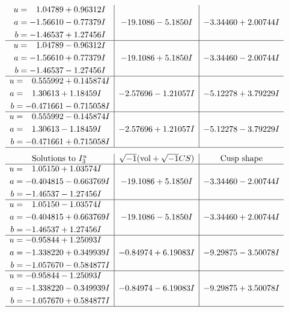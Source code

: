 \documentclass[1p]{elsarticle_modified}
\theoremstyle{definition}
\newcommand{\I}{\sqrt{-1}}
\begin{document}
$$\begin{array}{c|c|c}
\begin{aligned}
u &= \phantom{-}1.04789 + 0.96312 I \\
a &= -1.56610 - 0.77379 I \\
b &= -1.46537 + 1.27456 I\end{aligned}
 & -19.1086 - 5.1850 I & -3.34460 + 2.00744 I \\ \hline\begin{aligned}
u &= \phantom{-}1.04789 - 0.96312 I \\
a &= -1.56610 + 0.77379 I \\
b &= -1.46537 - 1.27456 I\end{aligned}
 & -19.1086 + 5.1850 I & -3.34460 - 2.00744 I \\ \hline\begin{aligned}
u &= \phantom{-}0.555992 + 0.145874 I \\
a &= \phantom{-}1.30613 + 1.18459 I \\
b &= -0.471661 - 0.715058 I\end{aligned}
 & -2.57696 - 1.21057 I & -5.12278 + 3.79229 I \\ \hline\begin{aligned}
u &= \phantom{-}0.555992 - 0.145874 I \\
a &= \phantom{-}1.30613 - 1.18459 I \\
b &= -0.471661 + 0.715058 I\end{aligned}
 & -2.57696 + 1.21057 I & -5.12278 - 3.79229 I\\
 \hline 
 \end{array}$$\newpage$$\begin{array}{c|c|c}  
\text{Solutions to }I^u_{3}& \I (\text{vol} + \sqrt{-1}CS) & \text{Cusp shape}\\
 \hline 
\begin{aligned}
u &= \phantom{-}1.05150 + 1.03574 I \\
a &= -0.404815 - 0.663769 I \\
b &= -1.46537 - 1.27456 I\end{aligned}
 & -19.1086 + 5.1850 I & -3.34460 - 2.00744 I \\ \hline\begin{aligned}
u &= \phantom{-}1.05150 - 1.03574 I \\
a &= -0.404815 + 0.663769 I \\
b &= -1.46537 + 1.27456 I\end{aligned}
 & -19.1086 - 5.1850 I & -3.34460 + 2.00744 I \\ \hline\begin{aligned}
u &= -0.95844 + 1.25093 I \\
a &= -1.338220 + 0.349939 I \\
b &= -1.057670 - 0.584877 I\end{aligned}
 & -0.84974 + 6.19083 I & -9.29875 - 3.50078 I \\ \hline\begin{aligned}
u &= -0.95844 - 1.25093 I \\
a &= -1.338220 - 0.349939 I \\
b &= -1.057670 + 0.584877 I\end{aligned}
 & -0.84974 - 6.19083 I & -9.29875 + 3.50078 I\\
 \hline 
 \end{array}$$\newpage\newpage\renewcommand{\arraystretch}{1}
\end{document}
